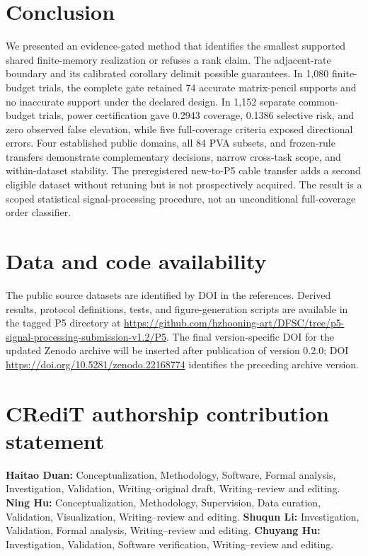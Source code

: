 \documentclass[11pt]{article}
\begin{document}
\section{Conclusion}
We presented an evidence-gated method that identifies the smallest supported shared finite-memory realization or refuses a rank claim. The adjacent-rate boundary and its calibrated corollary delimit possible guarantees. In 1,080 finite-budget trials, the complete gate retained 74 accurate matrix-pencil supports and no inaccurate support under the declared design. In 1,152 separate common-budget trials, power certification gave 0.2943 coverage, 0.1386 selective risk, and zero observed false elevation, while five full-coverage criteria exposed directional errors. Four established public domains, all 84 PVA subsets, and frozen-rule transfers demonstrate complementary decisions, narrow cross-task scope, and within-dataset stability. The preregistered new-to-P5 cable transfer adds a second eligible dataset without retuning but is not prospectively acquired. The result is a scoped statistical signal-processing procedure, not an unconditional full-coverage order classifier.

\section*{Data and code availability}
The public source datasets are identified by DOI in the references. Derived results, protocol definitions, tests, and figure-generation scripts are available in the tagged P5 directory at \url{https://github.com/hzhooning-art/DFSC/tree/p5-signal-processing-submission-v1.2/P5}. The final version-specific DOI for the updated Zenodo archive will be inserted after publication of version 0.2.0; DOI \url{https://doi.org/10.5281/zenodo.22168774} identifies the preceding archive version.

\section*{CRediT authorship contribution statement}
\textbf{Haitao Duan:} Conceptualization, Methodology, Software, Formal analysis, Investigation, Validation, Writing--original draft, Writing--review and editing. \textbf{Ning Hu:} Conceptualization, Methodology, Supervision, Data curation, Validation, Visualization, Writing--review and editing. \textbf{Shuqun Li:} Investigation, Validation, Formal analysis, Writing--review and editing. \textbf{Chuyang Hu:} Investigation, Validation, Software verification, Writing--review and editing.
\end{document}
